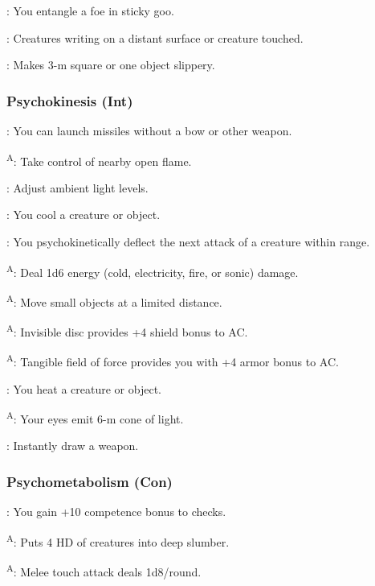 : You entangle a foe in sticky goo.

: Creatures writing on a distant surface or creature touched.

: Makes 3-m square or one object slippery.


\subsubsection{Psychokinesis (Int)}

: You can launch missiles without a bow or other weapon.

\textsuperscript{A}: Take control of nearby open flame.

: Adjust ambient light levels.

: You cool a creature or object.

: You psychokinetically deflect the next attack of a creature within range.

\textsuperscript{A}: Deal 1d6 energy (cold, electricity, fire, or sonic) damage.

\textsuperscript{A}: Move small objects at a limited distance.

\textsuperscript{A}: Invisible disc provides +4 shield bonus to AC.

\textsuperscript{A}: Tangible field of force provides you with +4 armor bonus to AC.

: You heat a creature or object.

\textsuperscript{A}: Your eyes emit 6-m cone of light.

: Instantly draw a weapon.


\subsubsection{Psychometabolism (Con)}

: You gain +10 competence bonus to  checks.

\textsuperscript{A}: Puts 4 HD of creatures into deep slumber.

\textsuperscript{A}: Melee touch attack deals 1d8/round.

